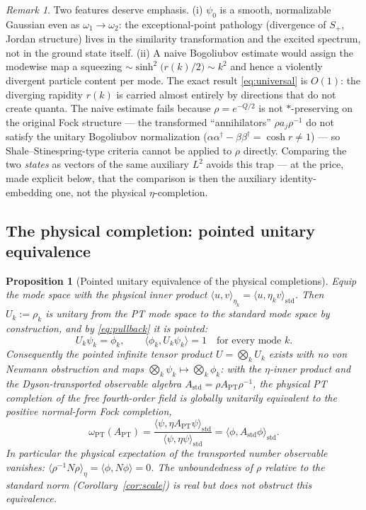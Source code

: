 \documentclass[11pt]{article}
\newtheorem{proposition}[theorem]{Proposition}
\theoremstyle{definition}
\theoremstyle{remark}
\newtheorem{remark}[theorem]{Remark}
\newcommand{\w}{\omega}
\newcommand{\dg}{\dagger}
\begin{document}
\begin{remark}
Two features deserve emphasis.  (i) $\psi_0$ is a smooth, normalizable
Gaussian even as $\w_1\to\w_2$: the exceptional-point pathology
(divergence of $S_+$, Jordan structure) lives in the similarity
transformation and the excited spectrum, not in the ground state itself.
(ii) A naive Bogoliubov estimate would assign the modewise map a squeezing
$\sim\sinh^2\!\big(r(k)/2\big)\sim k^2$ and hence a violently divergent
particle content per mode.  The exact result \eqref{eq:universal} is
$O(1)$: the diverging rapidity $r(k)$ is carried almost entirely by
directions that do not create quanta.  The naive estimate fails because
$\rho=e^{-Q/2}$ is not $*$-preserving on the original Fock structure ---
the transformed ``annihilators'' $\rho a_j\rho^{-1}$ do not satisfy the
unitary Bogoliubov normalization ($\alpha\alpha^{\dg}-\beta\beta^{\dg}
=\cosh r\ne1$) --- so Shale--Stinespring-type criteria cannot be applied to
$\rho$ directly.  Comparing the two \emph{states} as vectors of the same
auxiliary $L^2$ avoids this trap --- at the price, made explicit below,
that the comparison is then the auxiliary identity-embedding one, not the
physical $\eta$-completion.
\end{remark}

\subsection{The physical completion: pointed unitary equivalence}

\begin{proposition}[Pointed unitary equivalence of the physical
completions]\label{prop:pointed}
Equip the mode space with the physical inner product
$\langle u,v\rangle_{\eta_k}=\langle u,\eta_kv\rangle_{\mathrm{std}}$.
Then $U_k:=\rho_k$ is unitary from the PT mode space to the standard mode
space by construction, and by \eqref{eq:pullback} it is \emph{pointed}:
\begin{equation}
U_k\psi_k=\phi_k,
\qquad
\langle\phi_k,U_k\psi_k\rangle=1
\quad\text{for every mode }k .
\end{equation}
Consequently the pointed infinite tensor product
$U=\bigotimes_kU_k$ exists with no von Neumann obstruction and maps
$\bigotimes_k\psi_k\mapsto\bigotimes_k\phi_k$: \emph{with the
$\eta$-inner product and the Dyson-transported observable algebra
$A_{\mathrm{std}}=\rho A_{\mathrm{PT}}\rho^{-1}$, the physical PT
completion of the free fourth-order field is globally unitarily
equivalent to the positive normal-form Fock completion},
\begin{equation}
\omega_{\mathrm{PT}}(A_{\mathrm{PT}})
=\frac{\langle\psi,\eta A_{\mathrm{PT}}\psi\rangle_{\mathrm{std}}}
       {\langle\psi,\eta\psi\rangle_{\mathrm{std}}}
=\langle\phi,A_{\mathrm{std}}\phi\rangle_{\mathrm{std}} .
\end{equation}
In particular the physical expectation of the transported number
observable vanishes:
$\langle\rho^{-1}N\rho\rangle_{\eta}=\langle\phi,N\phi\rangle=0$.  The
unboundedness of $\rho$ relative to the standard norm
(Corollary~\ref{cor:scale}) is real but does not obstruct this
equivalence.
\end{proposition}
\end{document}
